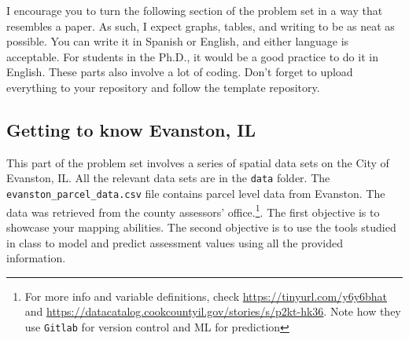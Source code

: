 \documentclass[12pt,onecolumn]{article}
\begin{document}
I encourage you to turn the following section of the problem set in a way that resembles a paper. As such, I expect graphs, tables, and writing to be as neat as possible. You can write it in Spanish or English, and either language is acceptable. For students in the Ph.D., it would be a good practice to do it in English.
These parts also involve a lot of coding. Don't forget to upload everything to your repository and follow the template repository. 



\subsection{Getting to know Evanston, IL}

This part of the problem set involves a series of spatial data sets on the City of Evanston, IL. All the relevant data sets are in the \texttt{data} folder.  The \texttt{evanston\_parcel\_data.csv} file contains parcel level data from Evanston. The data was retrieved from the county assessors' office.\footnote{For more info and variable definitions, check \url{https://tinyurl.com/y6y6bhat} and \url{https://datacatalog.cookcountyil.gov/stories/s/p2kt-hk36}. Note how they use \texttt{Gitlab} for version control and ML for prediction}. The first objective is to showcase your mapping abilities. The second objective is to use the tools studied in class to model and predict assessment values using all the provided information.
\end{document}

